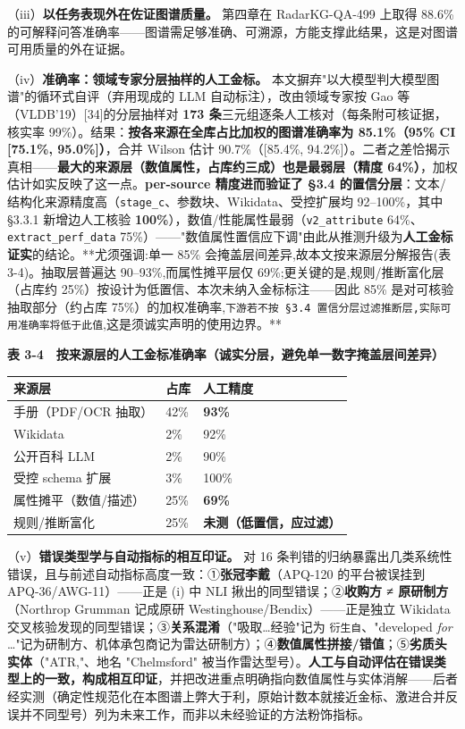 \documentclass[12pt,a4paper]{ctexart}
\begin{document}
（iii）\textbf{以任务表现外在佐证图谱质量。} 第四章在 RadarKG-QA-499 上取得 88.6\% 的可解释问答准确率——图谱需足够准确、可溯源，方能支撑此结果，这是对图谱可用质量的外在证据。

（iv）\textbf{准确率：领域专家分层抽样的人工金标。} 本文摒弃"以大模型判大模型图谱"的循环式自评（弃用现成的 LLM 自动标注），改由领域专家按 Gao 等（VLDB'19）[34]的分层抽样对 \textbf{173 条}三元组逐条人工核对（每条附可核证据，核实率 99\%）。结果：\textbf{按各来源在全库占比加权的图谱准确率为 85.1\%（95\% CI [75.1\%, 95.0\%]）}，合并 Wilson 估计 90.7\%（[85.4\%, 94.2\%]）。二者之差恰揭示真相——\textbf{最大的来源层（数值属性，占库约三成）也是最弱层（精度 64\%）}，加权估计如实反映了这一点。\textbf{per-source 精度进而验证了 §3.4 的置信分层}：文本/结构化来源精度高（\texttt{stage\_c}、参数块、Wikidata、受控扩展均 92–100\%，其中 §3.3.1 新增边人工核验 \textbf{100\%}），数值/性能属性最弱（\texttt{v2\_attribute} 64\%、\texttt{extract\_perf\_data} 75\%）——"数值属性置信应下调"由此从推测升级为\textbf{人工金标证实}的结论。**尤须强调:单一 85\% 会掩盖层间差异,故本文按来源层分解报告(表 3-4)。抽取层普遍达 90–93\%,而属性摊平层仅 69\%;更关键的是,规则/推断富化层（占库约 25\%）按设计为低置信、本次未纳入金标标注——因此 85\% 是对可核验抽取部分（约占库 75\%）的加权准确率,\texttt{下游若不按 §3.4 置信分层过滤推断层,实际可用准确率将低于此值},这是须诚实声明的使用边界。**

\textbf{表 3-4　按来源层的人工金标准确率（诚实分层，避免单一数字掩盖层间差异）}

\begin{center}\small
\begin{tabular}{|p{}|p{}|p{}|}
\hline
\textbf{来源层} & \textbf{占库} & \textbf{人工精度} \\ \hline
手册（PDF/OCR 抽取） & 42\% & \textbf{93\%} \\ \hline
Wikidata & 2\% & 92\% \\ \hline
公开百科 LLM & 2\% & 90\% \\ \hline
受控 schema 扩展 & 3\% & 100\% \\ \hline
属性摊平（数值/描述） & 25\% & \textbf{69\%} \\ \hline
规则/推断富化 & 25\% & \textbf{未测（低置信，应过滤）} \\ \hline
\end{tabular}
\end{center}

（v）\textbf{错误类型学与自动指标的相互印证。} 对 16 条判错的归纳暴露出几类系统性错误，且与前述自动指标高度一致：①\textbf{张冠李戴}（APQ-120 的平台被误挂到 APQ-36/AWG-11）——正是 (i) 中 NLI 揪出的同型错误；②\textbf{收购方 ≠ 原研制方}（Northrop Grumman 记成原研 Westinghouse/Bendix）——正是独立 Wikidata 交叉核验发现的同型错误；③\textbf{关系混淆}（"吸取…经验"记为 \texttt{衍生自}、"developed \textit{for} …"记为研制方、机体承包商记为雷达研制方）；④\textbf{数值属性拼接/错值}；⑤\textbf{劣质头实体}（"ATR,"、地名 "Chelmsford" 被当作雷达型号）。\textbf{人工与自动评估在错误类型上的一致，构成相互印证}，并把改进重点明确指向数值属性与实体消解——后者经实测（确定性规范化在本图谱上弊大于利，原始计数本就接近金标、激进合并反误并不同型号）列为未来工作，而非以未经验证的方法粉饰指标。
\end{document}
